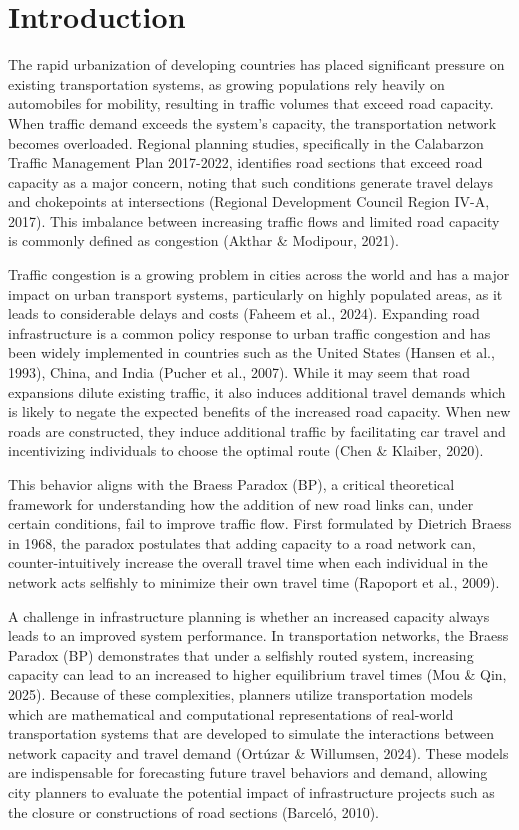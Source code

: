 
\chapter{Introduction}
\label{chap:introduction}

The rapid urbanization of developing countries has placed significant pressure on existing transportation systems, as growing populations rely heavily on automobiles for mobility, resulting in traffic volumes that exceed road capacity. When traffic demand exceeds the system's capacity, the transportation network becomes overloaded. Regional planning studies, specifically in the Calabarzon Traffic Management Plan 2017-2022,  identifies road sections that exceed road capacity as a major concern, noting that such conditions generate travel delays and chokepoints at intersections (Regional Development Council Region IV-A, 2017). This imbalance between increasing traffic flows and limited road capacity is commonly defined as congestion (Akthar \& Modipour, 2021). 

Traffic congestion is a growing problem in cities across the world and has a major impact on urban transport systems, particularly on highly populated areas, as it leads to considerable delays and costs (Faheem et al., 2024). Expanding road infrastructure is a common policy response to urban traffic congestion and has been widely implemented in countries such as the United States (Hansen et al., 1993), China, and India (Pucher et al., 2007). While it may seem that road expansions dilute existing traffic, it also induces additional travel demands which is likely to negate the expected benefits of the increased road capacity. When new roads are constructed, they induce additional traffic by facilitating car travel and incentivizing individuals to choose the optimal route (Chen \& Klaiber, 2020).

This behavior aligns with the Braess Paradox (BP), a critical theoretical framework for understanding how the addition of new road links can, under certain conditions, fail to improve traffic flow. First formulated by Dietrich Braess in 1968, the paradox postulates that adding capacity to a road network can, counter-intuitively increase the overall travel time when each individual in the network acts selfishly to minimize their own travel time (Rapoport et al., 2009). 

A challenge in infrastructure planning is whether an increased capacity always leads to an improved system performance. In transportation networks, the Braess Paradox (BP) demonstrates that under a selfishly routed system, increasing capacity can lead to an increased to higher equilibrium travel times (Mou \& Qin, 2025). Because of these complexities, planners utilize transportation models which are mathematical and computational representations of real-world transportation systems that are developed to simulate the interactions between network capacity and travel demand (Ortúzar \& Willumsen, 2024). These models are indispensable for forecasting future travel behaviors and demand, allowing city planners to evaluate the potential impact of infrastructure projects such as the closure or constructions of road sections (Barceló, 2010). 

